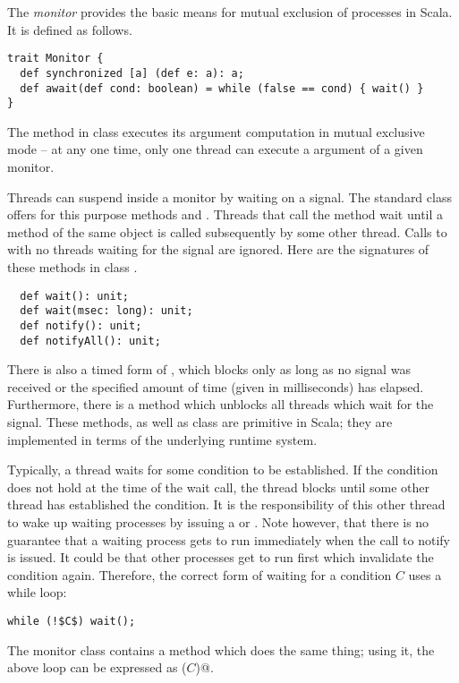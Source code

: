 \documentclass[a4paper,12pt,twoside,titlepage]{book}
\begin{document}
{\example
The {\em monitor} provides the basic means for mutual exclusion
of processes in Scala. It is defined as follows.
\begin{lstlisting}
trait Monitor {
  def synchronized [a] (def e: a): a;
  def await(def cond: boolean) = while (false == cond) { wait() }
}
\end{lstlisting}
The  method in class  executes its
argument computation  in mutual exclusive mode -- at any one
time, only one thread can execute a  argument of a
given monitor.

Threads can suspend inside a monitor by waiting on a signal.  The
standard  class offers for this purpose methods
 and .  Threads that call the 
method wait until a  method of the same object is called
subsequently by some other thread. Calls to  with no
threads waiting for the signal are ignored. 
Here are the signatures of these methods in class
.
\begin{lstlisting}
  def wait(): unit;
  def wait(msec: long): unit;
  def notify(): unit;
  def notifyAll(): unit;
\end{lstlisting}
There is also a timed form of , which blocks only as long
as no signal was received or the specified amount of time (given in
milliseconds) has elapsed. Furthermore, there is a 
method which unblocks all threads which wait for the signal. 
These methods, as well as class  are primitive in
Scala; they are implemented in terms of the underlying runtime system.

Typically, a thread waits for some condition to be established. If the
condition does not hold at the time of the wait call, the thread
blocks until some other thread has established the condition. It is
the responsibility of this other thread to wake up waiting processes
by issuing a  or . Note however, that
there is no guarantee that a waiting process gets to run immediately
when the call to notify is issued. It could be that other processes
get to run first which invalidate the condition again. Therefore, the
correct form of waiting for a condition $C$ uses a while loop:
\begin{lstlisting}
while (!$C$) wait();
\end{lstlisting}
The monitor class contains a method  which does the same 
thing; using it, the above loop can be expressed as \lstinline@await($C$)@.

}
\end{document}
